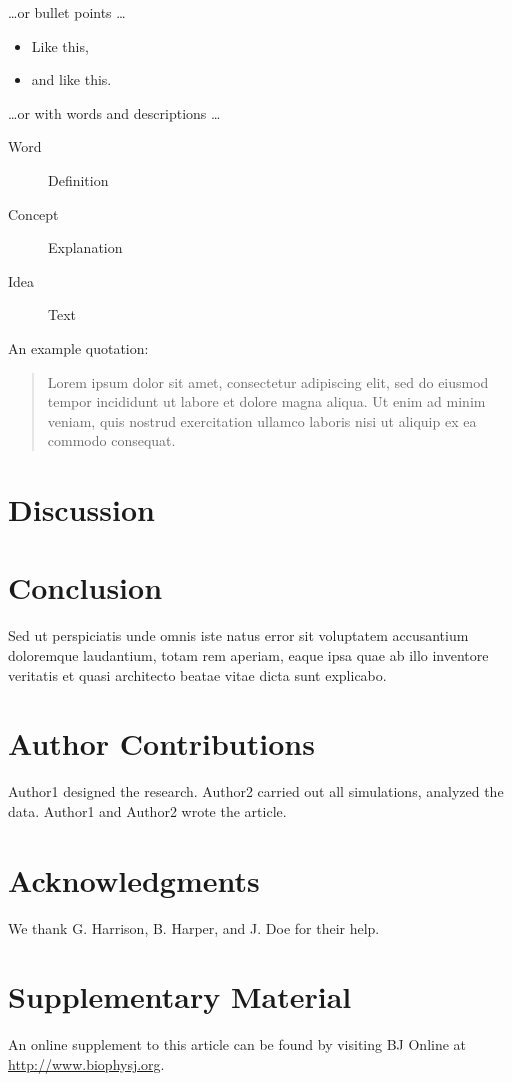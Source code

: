 \documentclass{biophys-new}
\begin{document}
\dots or bullet points \dots

\begin{itemize} 
\item Like this,
\item and like this.
\end{itemize}

\dots or with words and descriptions \dots

\begin{description}
\item[Word] Definition
\item[Concept] Explanation
\item[Idea] Text
\end{description}

An example quotation:

\begin{quote}
Lorem ipsum dolor sit amet, consectetur adipiscing elit, sed do eiusmod tempor incididunt ut labore et dolore magna aliqua. Ut enim ad minim veniam, quis nostrud exercitation ullamco laboris nisi ut aliquip ex ea commodo consequat.
\end{quote}


\section*{Discussion}


\section*{Conclusion}

Sed ut perspiciatis unde omnis iste natus error sit voluptatem accusantium doloremque laudantium, totam rem aperiam, eaque ipsa quae ab illo inventore veritatis et quasi architecto beatae vitae dicta sunt explicabo. 

\section*{Author Contributions}

Author1 designed the research. Author2 carried out all simulations, analyzed the data. Author1 and Author2 wrote the article. 

\section*{Acknowledgments}

We thank G. Harrison, B. Harper, and J. Doe for their help.




\section*{Supplementary Material}

An online supplement to this article can be found by visiting BJ Online at \url{http://www.biophysj.org}.
\end{document}
